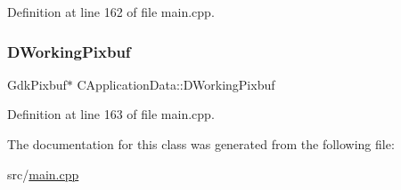 Definition at line 162 of file main.\+cpp.

\hypertarget{classCApplicationData_a19355c8cf25f216019db728219185119}{}\label{classCApplicationData_a19355c8cf25f216019db728219185119} 
\subsubsection{\texorpdfstring{D\+Working\+Pixbuf}{DWorkingPixbuf}}
{\footnotesize\ttfamily Gdk\+Pixbuf$\ast$ C\+Application\+Data\+::\+D\+Working\+Pixbuf\hspace{0.3cm}{\ttfamily [protected]}}



Definition at line 163 of file main.\+cpp.



The documentation for this class was generated from the following file\+:\begin{DoxyCompactItemize}
\item 
src/\hyperlink{main_8cpp}{main.\+cpp}\end{DoxyCompactItemize}
